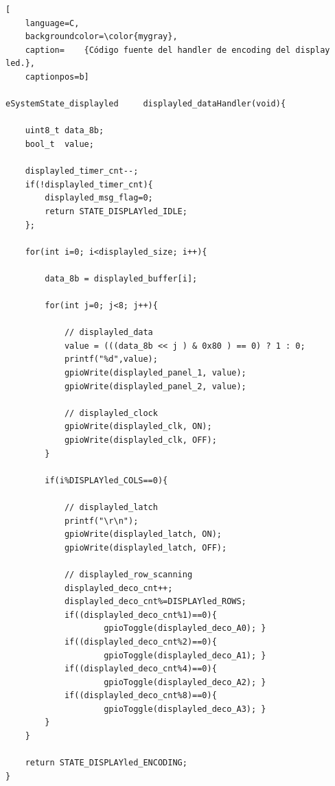 \begin{lstlisting}[
	language=C, 
	backgroundcolor=\color{mygray},
	caption=	{Código fuente del handler de encoding del display led.},
	captionpos=b]
	
eSystemState_displayled     displayled_dataHandler(void){

    uint8_t data_8b;
    bool_t  value;

    displayled_timer_cnt--;
    if(!displayled_timer_cnt){
        displayled_msg_flag=0;
        return STATE_DISPLAYled_IDLE;
    };    

    for(int i=0; i<displayled_size; i++){
        
        data_8b = displayled_buffer[i];
        
        for(int j=0; j<8; j++){
            
            // displayled_data 
            value = (((data_8b << j ) & 0x80 ) == 0) ? 1 : 0;
            printf("%d",value);
            gpioWrite(displayled_panel_1, value);
            gpioWrite(displayled_panel_2, value);
            
            // displayled_clock 
            gpioWrite(displayled_clk, ON);
            gpioWrite(displayled_clk, OFF);
        }
        
        if(i%DISPLAYled_COLS==0){

            // displayled_latch 
            printf("\r\n");
            gpioWrite(displayled_latch, ON);
            gpioWrite(displayled_latch, OFF);
            
            // displayled_row_scanning
            displayled_deco_cnt++;
            displayled_deco_cnt%=DISPLAYled_ROWS;
            if((displayled_deco_cnt%1)==0){ 
            		gpioToggle(displayled_deco_A0); }
            if((displayled_deco_cnt%2)==0){ 
            		gpioToggle(displayled_deco_A1); }
            if((displayled_deco_cnt%4)==0){ 
            		gpioToggle(displayled_deco_A2); }
            if((displayled_deco_cnt%8)==0){ 
            		gpioToggle(displayled_deco_A3); }
        }
    }
    
    return STATE_DISPLAYled_ENCODING;
}

\end{lstlisting}
